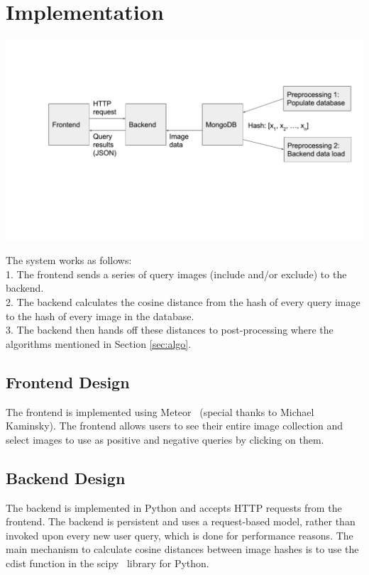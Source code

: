 \section{Implementation}
\begin{minipage}{1.0\columnwidth}
    \centering
    \includegraphics[width=0.9\columnwidth]{figs/system-design}
    \label{fig:system-design}
\end{minipage}
The system works as follows:\\
    1. The frontend sends a series of query images (include and/or exclude) to the backend. \\
    2. The backend calculates the cosine distance from the hash of every query image to the hash of every image in the database. \\
    3. The backend then hands off these distances to post-processing where the algorithms mentioned in Section \ref{sec:algo}.

\subsection{Frontend Design}
The frontend is implemented using Meteor~\cite{coleman2015discover} (special thanks to Michael Kaminsky).
The frontend allows users to see their entire image collection and select images to use as positive
and negative queries by clicking on them.

\subsection{Backend Design}
The backend is implemented in Python and accepts HTTP requests from the frontend.
The backend is persistent and uses a request-based model, rather than invoked upon every new user query,
which is done for performance reasons.
The main mechanism to calculate cosine distances between image hashes is to use the cdist function in the
scipy~\cite{jones2001open} library for Python.

